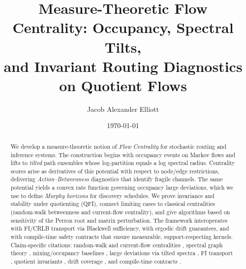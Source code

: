 \documentclass[11pt]{article}
\title{\textbf{Measure-Theoretic Flow Centrality: Occupancy, Spectral Tilts,\\
and Invariant Routing Diagnostics on Quotient Flows}}
\author{Jacob Alexander Elliott}
\date{\today}
\newcommand{\1}{\mathbbm{1}}
\begin{document}
\maketitle

\begin{abstract}
We develop a measure-theoretic notion of \emph{Flow Centrality} for stochastic routing and inference systems. The construction begins with occupancy events on Markov flows and lifts to \emph{tilted} path ensembles whose log-partition equals a log spectral radius. Centrality scores arise as derivatives of this potential with respect to node/edge restrictions, delivering \emph{Action--Betweenness} diagnostics that identify fragile channels. The same potential yields a convex rate function governing occupancy large deviations, which we use to define \emph{Murphy horizons} for discovery schedules. We prove invariance and stability under quotienting (QFI), connect limiting cases to classical centralities (random-walk betweenness and current-flow centrality), and give algorithms based on sensitivity of the Perron root and matrix perturbation. The framework interoperates with FI/CRLB transport via Blackwell sufficiency, with ergodic drift guarantees, and with compile-time safety contracts that ensure measurable, support-respecting kernels. Claim-specific citations: random-walk and current-flow centralities \parencite{Newman2005,DoyleSnell1984}, spectral graph theory \parencite{Chung1997}, mixing/occupancy baselines \parencite{LevinPeresWilmer2009,KemenySnell1976}, large deviations via tilted spectra \parencite{DemboZeitouni1998}, FI transport \parencite{Blackwell1953,AmariNagaoka2000,Cencov1982}, quotient invariants \parencite{elliott2025qfi}, drift coverage \parencite{MeynTweedie2009,elliott2025drift}, and compile-time contracts \parencite{elliott2025contracts,elliott2025graded}.
\end{abstract}

\end{document}

